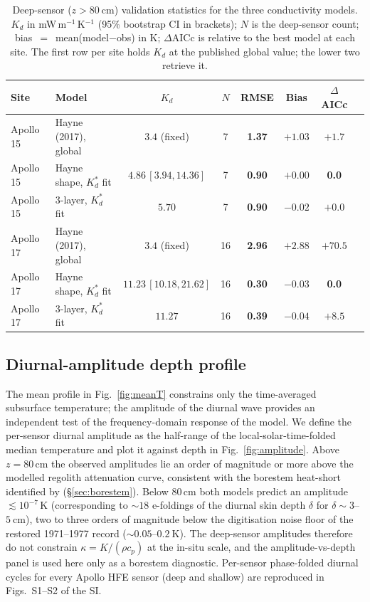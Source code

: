 \documentclass[11pt]{article}
\newcommand{\zborestem}{80\,\si{\centi\meter}}
\begin{document}
\begin{table}[t]
\centering
\small
\caption{Deep-sensor ($z>\SI{80}{\centi\meter}$) validation
statistics for the three conductivity models. $K_d$ in
mW\,m$^{-1}$\,K$^{-1}$ (95\% bootstrap CI in brackets); $N$ is the
deep-sensor count; bias~$=$~mean(model$-$obs) in K; $\Delta$AICc is
relative to the best model at each site. The first row per site holds
$K_d$ at the published global value; the lower two retrieve it.}
\label{tab:rmse}
\begin{tabular}{llcccccc}
\toprule
Site & Model & $K_d$ & $N$ & RMSE & Bias & $\Delta$AICc \\
\midrule
Apollo 15 & Hayne (2017), global       & $3.4$ (fixed)            & 7  & \textbf{1.37} & $+1.03$ & $+1.7$ \\
Apollo 15 & Hayne shape, $K_d^{*}$ fit & $4.86\,[3.94,14.36]$     & 7  & \textbf{0.90} & $+0.00$ & \textbf{0.0} \\
Apollo 15 & 3-layer, $K_d^{*}$ fit     & $5.70$                   & 7  & \textbf{0.90} & $-0.02$ & $+0.0$ \\
\midrule
Apollo 17 & Hayne (2017), global       & $3.4$ (fixed)            & 16 & \textbf{2.96} & $+2.88$ & $+70.5$ \\
Apollo 17 & Hayne shape, $K_d^{*}$ fit & $11.23\,[10.18,21.62]$   & 16 & \textbf{0.30} & $-0.03$ & \textbf{0.0} \\
Apollo 17 & 3-layer, $K_d^{*}$ fit     & $11.27$                  & 16 & \textbf{0.39} & $-0.04$ & $+8.5$ \\
\bottomrule
\end{tabular}
\end{table}

\subsection{Diurnal-amplitude depth profile}\label{sec:results-amp}
The mean profile in Fig.~\ref{fig:meanT} constrains only the
time-averaged subsurface temperature; the amplitude of the diurnal
wave provides an independent test of the frequency-domain response
of the model. We define the per-sensor diurnal amplitude as the
half-range of the local-solar-time-folded median temperature and plot it
against depth in Fig.~\ref{fig:amplitude}. Above
$z\!=\!\zborestem$ the observed amplitudes lie an order of magnitude
or more above the modelled regolith attenuation curve, consistent
with the borestem heat-short identified by \citet{nagihara2018}
(\S\ref{sec:borestem}). Below $\zborestem$ both models predict an
amplitude $\lesssim\!10^{-7}\,\si{\kelvin}$ (corresponding to
$\sim\!18$ e-foldings of the diurnal skin depth $\delta$ for
$\delta\sim 3$--$\SI{5}{\centi\meter}$), two to three orders of
magnitude below the digitisation noise floor of the restored
1971--1977 record ($\sim\!0.05$--$\SI{0.2}{\kelvin}$). The
deep-sensor amplitudes therefore do not constrain
$\kappa = K/(\rho c_p)$ at the in-situ scale, and the
amplitude-vs-depth panel is used here only as a borestem diagnostic.
Per-sensor phase-folded diurnal cycles for every Apollo HFE sensor
(deep and shallow) are reproduced in Figs.~S1--S2 of the SI.
\end{document}
